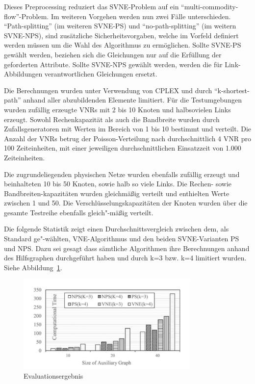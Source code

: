 \documentclass{lni}
\begin{document}
Dieses Preprocessing reduziert das SVNE-Problem auf ein "`multi-commodity-flow"'-Problem. \cite{MCF}
Im weiteren Vorgehen werden nun zwei Fälle unterschieden. "`Path-splitting"' (im weiteren SVNE-PS) und "`no-path-splitting"' (im weitern SVNE-NPS), sind zusätzliche Sicherheitsvorgaben, welche im Vorfeld definiert werden müssen um die Wahl des Algorithmus zu ermöglichen. Sollte SVNE-PS gewählt werden, beziehen sich die Gleichungen nur auf die Erfüllung der geforderten Attribute.
Sollte SVNE-NPS gewählt werden, werden die für Link-Abbildungen verantwortlichen Gleichungen ersetzt.\newline

Die Berechnungen wurden unter Verwendung von CPLEX und durch "`k-shortest-path"' anhand aller abzubildenden Elemente limitiert. \cite{CPLEX}
Für die Testumgebungen wurden zufällig erzeugte VNRs mit 2 bis 10 Knoten und halbsovielen Links erzeugt. Sowohl Rechenkapazität als auch die  Bandbreite wurden durch Zufallsgeneratoren mit Werten im Bereich von 1 bis 10 bestimmt und verteilt. Die Anzahl der VNRs betrug der Poisson-Verteilung nach durchschnittlich 4 VNR pro 100 Zeiteinheiten, mit einer jeweiligen durchschnittlichen Einsatzzeit von 1.000 Zeiteinheiten.

Die zugrundeliegenden physischen Netze wurden ebenfalls zufällig erzeugt und beinhalteten 10 bis 50 Knoten, sowie halb so viele Links. Die Rechen- sowie Bandbreiten-kapazitäten wurden gleichmäßig verteilt und enthielten Werte zwischen 1 und 50. Die Verschlüsselungskapazitäten der Knoten  wurden über die gesamte Testreihe ebenfalls gleich"-mäßig verteilt.

Die folgende Statistik zeigt einen Durchschnittsvergleich zwischen dem, als Standard ge"-wählten, VNE-Algorithmus und den beiden SVNE-Varianten PS und NPS. \cite{Std} Dazu sei gesagt dass sämtliche Algorithmen ihre Berechnungen anhand des Hilfsgraphen durchgeführt haben und durch k=3 bzw. k=4 limitiert wurden. Siehe Abbildung~\ref{graph10}. \newline

\begin{figure}[htb]
\begin{center}
	\includegraphics[width=0.8\textwidth]{statistic.pdf}\newline
	\caption{\label{graph10} Evaluationsergebnis \cite{wang2016towards}}
\end{center}
\end{figure}
\end{document}
